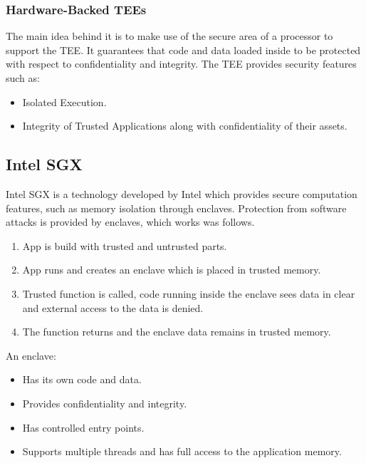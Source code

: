 \subsubsection{Hardware-Backed TEEs}
The main idea behind it is to make use of the secure area of a processor to support the TEE.
It guarantees that code and data loaded inside to be protected with respect to confidentiality and integrity.
The TEE provides security features such as:
\begin{itemize}
    \item Isolated Execution.
    \item Integrity of Trusted Applications along with confidentiality of their assets.
\end{itemize}

\subsection{Intel SGX}
Intel SGX is a technology developed by Intel which provides secure computation features, such as memory isolation through enclaves.
Protection from software attacks is provided by enclaves, which works was follows.
\begin{enumerate}
    \item App is build with trusted and untrusted parts.
    \item App runs and creates an enclave which is placed in trusted memory.
    \item Trusted function is called,
    code running inside the enclave sees data in clear and
    external access to the data is denied.
    \item The function returns and the enclave data remains in trusted memory.
\end{enumerate}

An enclave:
\begin{itemize}
    \item Has its own code and data.
    \item Provides confidentiality and integrity.
    \item Has controlled entry points.
    \item Supports multiple threads and has full access to the application memory.
\end{itemize}

